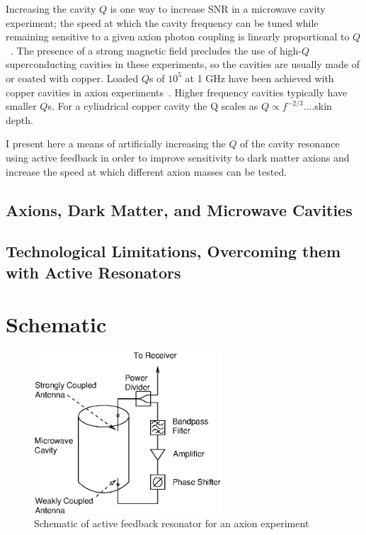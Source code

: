 \documentclass[aps,prl,twocolumn,groupedaddress]{revtex4-1}
\begin{document}
Increasing the cavity $Q$ is one way to increase SNR in a microwave cavity experiment; the speed at which the cavity frequency can be tuned while remaining sensitive to a given axion photon coupling is linearly proportional to $Q$~\cite{Peng2000569}.
The presence of a strong magnetic field precludes the use of high-$Q$ superconducting cavities in these experiments, so the cavities are usually made of or coated with copper.
Loaded $Q$s of $10^5$ at 1 GHz have been achieved with copper cavities in axion experiments~\cite{Peng2000569}.  Higher frequency cavities typically have smaller $Q$s.
For a cylindrical copper cavity the Q scales as $Q \propto f^{-2/3}$....skin depth.

I present here a means of artificially increasing the $Q$ of the cavity resonance using active feedback in order to improve sensitivity to dark matter axions and increase the speed at which different axion masses can be tested.

\subsection{Axions, Dark Matter, and Microwave Cavities}

\subsection{Technological Limitations, Overcoming them with Active Resonators}

\section{Schematic}

\begin{figure}
\includegraphics[width=7cm]{figs/experiment_schematic.eps}
\caption{\label{fig:experiment_schematic} Schematic of active feedback resonator for an axion experiment}
\end{figure}
\end{document}
